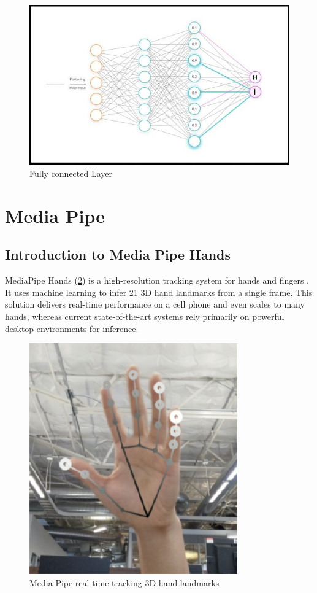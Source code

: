 \begin{figure}[H]
	\centering
	\includegraphics[width=\textwidth]{img/Chap3/FC}
	\caption{ Fully connected Layer}
	\label{fig:Chap3-FC}
\end{figure}
\section{ Media Pipe}\label{sec:MediaPipe}
\subsection{Introduction to Media Pipe Hands}
MediaPipe Hands (\ref{fig:Chap3-MediaPipe}) is a high-resolution tracking system for hands and fingers \cite{zhang2020mediapipe}. It uses machine learning to infer 21 3D hand landmarks from a single frame. This solution delivers real-time performance on a cell phone and even scales to many hands, whereas current state-of-the-art systems rely primarily on powerful desktop environments for inference.

\begin{figure}[H]
	\centering
	\includegraphics[width=0.8\textwidth]{img/Chap3/Media Pipe}
	\caption{ Media Pipe real time tracking 3D hand landmarks}
	\label{fig:Chap3-MediaPipe}
\end{figure}

